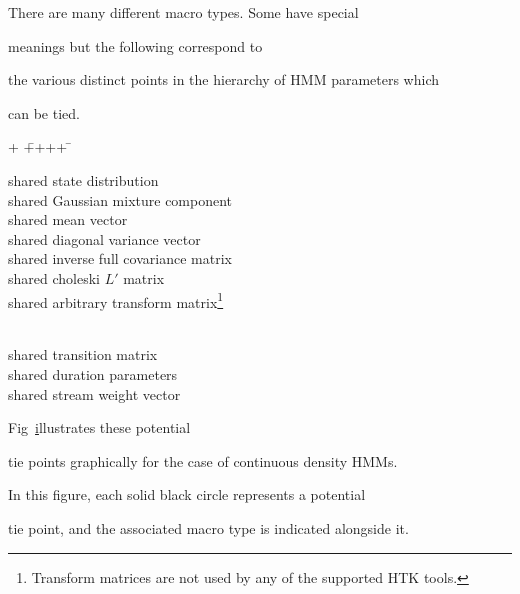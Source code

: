 There are many different macro types.  Some have special


meanings but the following correspond to


the various distinct points in the hierarchy of HMM parameters which


can be tied.  


\begin{tabbing}


+ \= ++++ \=  \kill


\>  \>  shared state distribution\\


\>  \>  shared Gaussian mixture component \\


\>  \>  shared mean vector \\


\>  \>  shared diagonal variance vector \\


\>  \>  shared inverse full covariance matrix \\


\>  \>  shared choleski $L'$ matrix \\


\>  \>  shared arbitrary transform matrix\footnote{


Transform matrices are not used by any of the supported HTK tools.


}


 \\


\>  \>  shared transition matrix \\


\>  \>  shared duration parameters \\


\>  \>  shared stream weight vector 


\end{tabbing}





Fig~\href{f:hierarch} illustrates these potential


tie points graphically for the case of continuous density HMMs.


In this figure, each solid black circle represents a potential


tie point, and the associated macro type is indicated alongside it.





